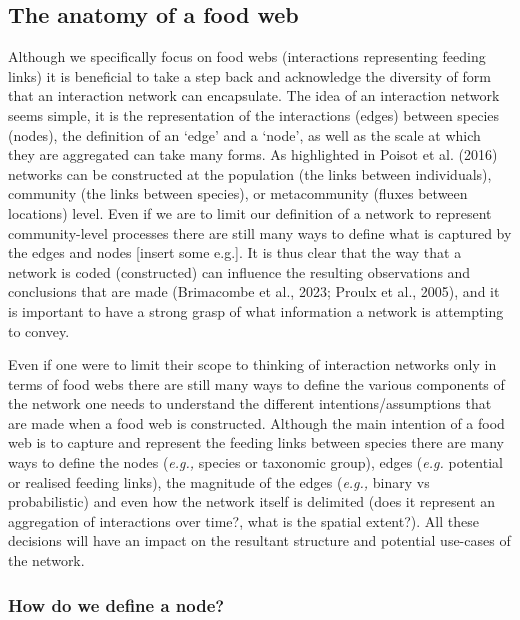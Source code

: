\documentclass[
]{agujournal2019}
\begin{document}
\subsection{The anatomy of a food web}\label{the-anatomy-of-a-food-web}

Although we specifically focus on food webs (interactions representing
feeding links) it is beneficial to take a step back and acknowledge the
diversity of form that an interaction network can encapsulate. The idea
of an interaction network seems simple, it is the representation of the
interactions (edges) between species (nodes), the definition of an
`edge' and a `node', as well as the scale at which they are aggregated
can take many forms. As highlighted in Poisot et al. (2016) networks can
be constructed at the population (the links between individuals),
community (the links between species), or metacommunity (fluxes between
locations) level. Even if we are to limit our definition of a network to
represent community-level processes there are still many ways to define
what is captured by the edges and nodes {[}insert some e.g.{]}. It is
thus clear that the way that a network is coded (constructed) can
influence the resulting observations and conclusions that are made
(Brimacombe et al., 2023; Proulx et al., 2005), and it is important to
have a strong grasp of what information a network is attempting to
convey.

Even if one were to limit their scope to thinking of interaction
networks only in terms of food webs there are still many ways to define
the various components of the network one needs to understand the
different intentions/assumptions that are made when a food web is
constructed. Although the main intention of a food web is to capture and
represent the feeding links between species there are many ways to
define the nodes (\emph{e.g.,} species or taxonomic group), edges
(\emph{e.g.} potential or realised feeding links), the magnitude of the
edges (\emph{e.g.,} binary vs probabilistic) and even how the network
itself is delimited (does it represent an aggregation of interactions
over time?, what is the spatial extent?). All these decisions will have
an impact on the resultant structure and potential use-cases of the
network.

\subsubsection{How do we define a node?}\label{how-do-we-define-a-node}
\end{document}
